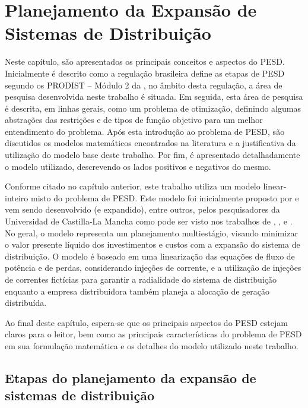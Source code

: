 \chapter{Planejamento da Expansão de Sistemas de Distribuição}
\label{chp:pesd}

Neste capítulo, são apresentados os principais conceitos e aspectos do \ac{PESD}. Inicialmente é descrito como a regulação brasileira define as etapas de \ac{PESD} segundo os \ac{PRODIST} -- Módulo 2 da , no âmbito desta regulação, a área de pesquisa desenvolvida neste trabalho é situada. Em seguida, esta área de pesquisa é descrita, em linhas gerais, como um problema de otimização, definindo algumas abstrações das restrições e de tipos de função objetivo para um melhor entendimento do problema. Após esta introdução ao problema de \ac{PESD}, são discutidos os modelos matemáticos encontrados na literatura e a justificativa da utilização do modelo base deste trabalho. Por fim, é apresentado detalhadamente o modelo utilizado, descrevendo os lados positivos e negativos do mesmo.

Conforme citado no capítulo anterior, este trabalho utiliza um modelo linear-inteiro misto do problema de \ac{PESD}. Este modelo foi inicialmente proposto por  e vem sendo desenvolvido (e expandido), entre outros, pelos pesquisadores da Universidad de Castilla-La Mancha como pode ser visto nos trabalhos de , , e . No geral, o modelo representa um planejamento multiestágio, visando minimizar o valor presente líquido dos investimentos e custos com a expansão do sistema de distribuição. O modelo é baseado em uma linearização das equações de fluxo de potência e de perdas, considerando injeções de corrente, e a utilização de injeções de correntes fictícias para garantir a radialidade do sistema de distribuição enquanto a empresa distribuidora também planeja a alocação de geração distribuída.

Ao final deste capítulo, espera-se que os principais aspectos do PESD estejam claros para o leitor, bem como as principais características do problema de PESD em sua formulação matemática e os detalhes do modelo utilizado neste trabalho.



\section{Etapas do planejamento da expansão de sistemas de distribuição}


